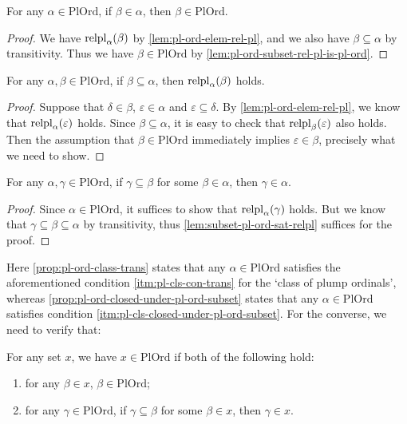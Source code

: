 \documentclass[12pt,openany]{book}
\theoremstyle{plain}
\theoremstyle{definition}
\newcommand\uplabel[1]{\textup{(#1)}}
\DeclareMathOperator\relpl{relpl}
\newcommand\PlOrd{\mathrm{PlOrd}}
\begin{document}
\begin{proposition}
  \label{prop:pl-ord-class-trans}
  For any $\alpha \in \PlOrd$, if $\beta \in \alpha$, then $\beta \in \PlOrd$.
\end{proposition}

\begin{proof}
  We have $\relpl_\alpha\mleft(\beta\mright)$ by \autoref{lem:pl-ord-elem-rel-pl}, and we also have $\beta \subseteq \alpha$ by transitivity. Thus we have $\beta \in \PlOrd$ by \autoref{lem:pl-ord-subset-rel-pl-is-pl-ord}.
\end{proof}

\begin{lemma}
  \label{lem:subset-pl-ord-sat-relpl}
  For any $\alpha, \beta \in \PlOrd$, if $\beta \subseteq \alpha$, then $\relpl_\alpha\mleft(\beta\mright)$ holds.
\end{lemma}

\begin{proof}
  Suppose that $\delta \in \beta$, $\varepsilon \in \alpha$ and $\varepsilon \subseteq \delta$. By \autoref{lem:pl-ord-elem-rel-pl}, we know that $\relpl_\alpha\mleft(\varepsilon\mright)$ holds. Since $\beta \subseteq \alpha$, it is easy to check that $\relpl_\beta\mleft(\varepsilon\mright)$ also holds. Then the assumption that $\beta \in \PlOrd$ immediately implies $\varepsilon \in \beta$, precisely what we need to show.
\end{proof}

\begin{proposition}
  \label{prop:pl-ord-closed-under-pl-ord-subset}
  For any $\alpha, \gamma \in \PlOrd$, if $\gamma \subseteq \beta$ for some $\beta \in \alpha$, then $\gamma \in \alpha$.
\end{proposition}

\begin{proof}
  Since $\alpha \in \PlOrd$, it suffices to show that $\relpl_\alpha\mleft(\gamma\mright)$ holds. But we know that $\gamma \subseteq \beta \subseteq \alpha$ by transitivity, thus \autoref{lem:subset-pl-ord-sat-relpl} suffices for the proof.
\end{proof}

Here \autoref{prop:pl-ord-class-trans} states that any $\alpha \in \PlOrd$ satisfies the aforementioned condition \ref{itm:pl-cls-con-trans} for the `class of plump ordinals', whereas \autoref{prop:pl-ord-closed-under-pl-ord-subset} states that any $\alpha \in \PlOrd$ satisfies condition \ref{itm:pl-cls-closed-under-pl-ord-subset}. For the converse, we need to verify that:
\begin{proposition}
  \label{prop:pl-ord-crit}
  For any set $x$, we have $x \in \PlOrd$ if both of the following hold:
  \begin{enumerate}[label=\uplabel{\arabic*}]
    \item \label{itm:pl-ord-proof-con-trans} for any $\beta \in x$, $\beta \in \PlOrd$;
    \item \label{itm:pl-ord-proof-closed-under-pl-ord-subset} for any $\gamma \in \PlOrd$, if $\gamma \subseteq \beta$ for some $\beta \in x$, then $\gamma \in x$.
  \end{enumerate}
\end{proposition}
\end{document}
